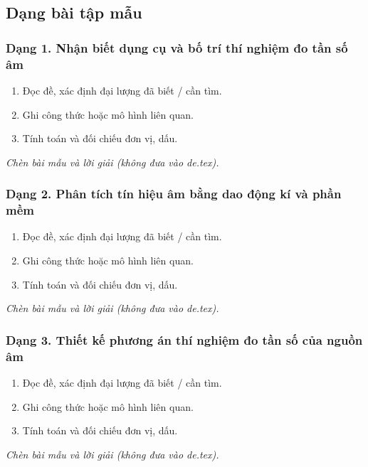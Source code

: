 

\subsection{Dạng bài tập mẫu}
\subsubsection{Dạng 1. Nhận biết dụng cụ và bố trí thí nghiệm đo tần số âm}
\begin{phuongphap}
\begin{enumerate}
\item Đọc đề, xác định đại lượng đã biết / cần tìm.
\item Ghi công thức hoặc mô hình liên quan.
\item Tính toán và đối chiếu đơn vị, dấu.
\end{enumerate}
\end{phuongphap}
\begin{vidumau}
\textit{Chèn bài mẫu và lời giải (không đưa vào de.tex).}
\end{vidumau}

\subsubsection{Dạng 2. Phân tích tín hiệu âm bằng dao động kí và phần mềm}
\begin{phuongphap}
\begin{enumerate}
\item Đọc đề, xác định đại lượng đã biết / cần tìm.
\item Ghi công thức hoặc mô hình liên quan.
\item Tính toán và đối chiếu đơn vị, dấu.
\end{enumerate}
\end{phuongphap}
\begin{vidumau}
\textit{Chèn bài mẫu và lời giải (không đưa vào de.tex).}
\end{vidumau}

\subsubsection{Dạng 3. Thiết kế phương án thí nghiệm đo tần số của nguồn âm}
\begin{phuongphap}
\begin{enumerate}
\item Đọc đề, xác định đại lượng đã biết / cần tìm.
\item Ghi công thức hoặc mô hình liên quan.
\item Tính toán và đối chiếu đơn vị, dấu.
\end{enumerate}
\end{phuongphap}
\begin{vidumau}
\textit{Chèn bài mẫu và lời giải (không đưa vào de.tex).}
\end{vidumau}


